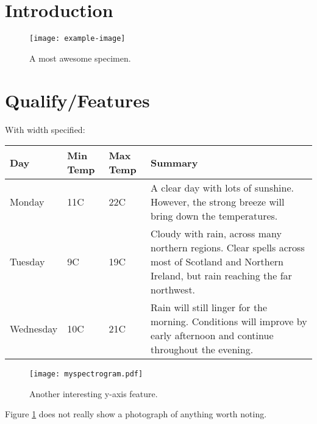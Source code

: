 \documentclass[journal,comsoc]{IEEEtran}
\begin{document}
\renewcommand \thesection{\arabic{section}} %

\section{Introduction}

\lipsum[2]

\begin{figure}[thb]
	\centering  
	\texttt{[image: example-image]}
	\caption{A most awesome specimen.}
	\label{fig:graysquare}
\end{figure}

\section{Qualify/Features}

\lipsum[1]

\vspace{\baselineskip}

With width specified:
\begin{center}
    \begin{tabular}{ | l | l | l | p{5cm} |}
    \hline
    Day & Min Temp & Max Temp & Summary \\ \hline
    Monday & 11C & 22C & A clear day with lots of sunshine.  
    However, the strong breeze will bring down the temperatures. \\ \hline
    Tuesday & 9C & 19C & Cloudy with rain, across many northern regions. Clear spells 
    across most of Scotland and Northern Ireland, 
    but rain reaching the far northwest. \\ \hline
    Wednesday & 10C & 21C & Rain will still linger for the morning. 
    Conditions will improve by early afternoon and continue 
    throughout the evening. \\
    \hline
    \end{tabular}
\end{center}

\begin{figure}[thb]
	\centering  
	\texttt{[image: myspectrogram.pdf]}
	\caption{Another interesting y-axis feature.}
	\label{fig:specgram}
\end{figure}

Figure \ref{fig:graysquare} does not really show a photograph of anything worth noting.  \lipsum
\end{document}

